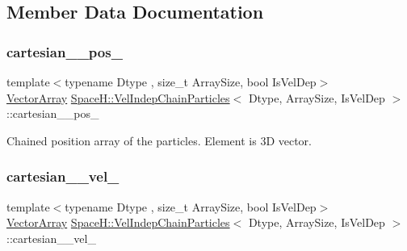 \subsection{Member Data Documentation}
\mbox{\label{class_space_h_1_1_vel_indep_chain_particles_ae1479bfdab0d0676ee500f878698a75a}} 
\subsubsection{\texorpdfstring{cartesian_\+\_\+pos\+\_\+}{cartesian_\_pos\_}}
{\footnotesize\ttfamily template$<$typename Dtype , size\+\_\+t Array\+Size, bool Is\+Vel\+Dep$>$ \\
\mbox{\hyperlink{class_space_h_1_1_vel_indep_particles_aa9983058940249df8b00fa800e8cbad2}{Vector\+Array}} \mbox{\hyperlink{class_space_h_1_1_vel_indep_chain_particles}{Space\+H\+::\+Vel\+Indep\+Chain\+Particles}}$<$ Dtype, Array\+Size, Is\+Vel\+Dep $>$\+::cartesian_\+\_\+pos\+\_\+\hspace{0.3cm}{\ttfamily [protected]}}



Chained position array of the particles. Element is 3D vector. 

\mbox{\label{class_space_h_1_1_vel_indep_chain_particles_a8634735aa331abbdd5befc3d208b11eb}} 
\subsubsection{\texorpdfstring{cartesian_\+\_\+vel\+\_\+}{cartesian_\_vel\_}}
{\footnotesize\ttfamily template$<$typename Dtype , size\+\_\+t Array\+Size, bool Is\+Vel\+Dep$>$ \\
\mbox{\hyperlink{class_space_h_1_1_vel_indep_particles_aa9983058940249df8b00fa800e8cbad2}{Vector\+Array}} \mbox{\hyperlink{class_space_h_1_1_vel_indep_chain_particles}{Space\+H\+::\+Vel\+Indep\+Chain\+Particles}}$<$ Dtype, Array\+Size, Is\+Vel\+Dep $>$\+::cartesian_\+\_\+vel\+\_\+\hspace{0.3cm}{\ttfamily [protected]}}



